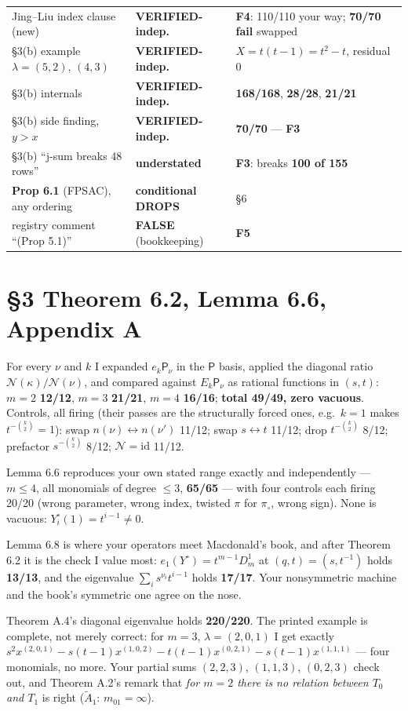 \documentclass[11pt]{article}
\newcommand{\N}{\mathcal N}
\begin{document}
\begin{longtable}{@{}p{}p{}p{}@{}}
Jing--Liu index clause (new) & \textbf{VERIFIED-indep.} & \textbf{F4}: 110/110 your way; \textbf{70/70 fail} swapped\\
\S3(b) example $\lambda=(5,2)$, $(4,3)$ & \textbf{VERIFIED-indep.} & $X=t(t-1)=t^2-t$, residual 0\\
\S3(b) internals & \textbf{VERIFIED-indep.} & \textbf{168/168}, \textbf{28/28}, \textbf{21/21}\\
\S3(b) side finding, $y>x$ & \textbf{VERIFIED-indep.} & \textbf{70/70} --- \textbf{F3}\\
\S3(b) ``j-sum breaks 48 rows'' & \textbf{understated} & \textbf{F3}: breaks \textbf{100 of 155}\\
\textbf{Prop 6.1} (FPSAC), any ordering & \textbf{conditional DROPS} & \S6\\
registry comment ``(Prop 5.1)'' & \textbf{FALSE} (bookkeeping) & \textbf{F5}\\
\bottomrule
\end{longtable}

\section*{\S3 Theorem 6.2, Lemma 6.6, Appendix A}
For every $\nu$ and $k$ I expanded $e_k\mathsf P_\nu$ in the $\mathsf P$ basis, applied
the diagonal ratio $\N(\kappa)/\N(\nu)$, and compared against $E_k\mathsf P_\nu$ as
rational functions in $(s,t)$: $m{=}2$ \textbf{12/12}, $m{=}3$ \textbf{21/21}, $m{=}4$
\textbf{16/16}; \textbf{total 49/49, zero vacuous}. Controls, all firing (their passes
are the structurally forced ones, e.g.\ $k=1$ makes $t^{-\binom k2}=1$):
swap $n(\nu)\!\leftrightarrow\!n(\nu')$ 11/12; swap $s\!\leftrightarrow\!t$ 11/12;
drop $t^{-\binom k2}$ 8/12; prefactor $s^{-\binom k2}$ 8/12; $\N=\mathrm{id}$ 11/12.

Lemma 6.6 reproduces your own stated range exactly and independently --- $m\le4$, all
monomials of degree $\le3$, \textbf{65/65} --- with four controls each firing 20/20
(wrong parameter, wrong index, twisted $\pi$ for $\pi_\circ$, wrong sign). None is
vacuous: $Y^\circ_i(1)=t^{i-1}\neq0$.

Lemma 6.8 is where your operators meet Macdonald's book, and after Theorem 6.2 it is the
check I value most: $e_1(Y^\circ)=t^{m-1}D^1_m$ at $(q,t)=(s,t^{-1})$ holds
\textbf{13/13}, and the eigenvalue $\sum_is^{\nu_i}t^{i-1}$ holds \textbf{17/17}. Your
nonsymmetric machine and the book's symmetric one agree on the nose.

Theorem A.4's diagonal eigenvalue holds \textbf{220/220}. The printed example is
complete, not merely correct: for $m=3$, $\lambda=(2,0,1)$ I get exactly
$s^2x^{(2,0,1)}-s(t-1)x^{(1,0,2)}-t(t-1)x^{(0,2,1)}-s(t-1)x^{(1,1,1)}$ --- four
monomials, no more. Your partial sums $(2,2,3)$, $(1,1,3)$, $(0,2,3)$ check out, and
Theorem A.2's remark that \emph{for $m=2$ there is no relation between $T_0$ and $T_1$}
is right ($\widetilde A_1$: $m_{01}=\infty$).
\end{document}
